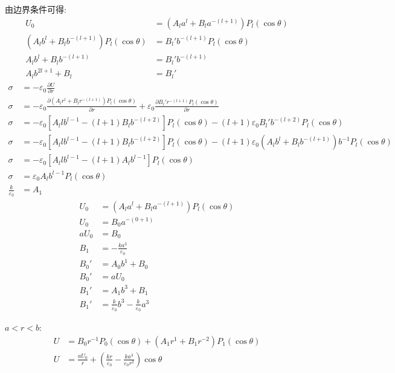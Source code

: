 由边界条件可得:
\begin{align*}
        U_0
&=
\left(
A_l a^l
+
B_l a^{-(l+1)}
\right)
P_{l}(\cos\theta)\\
    \left(
A_l b^l
+
B_l b^{-(l+1)}
\right)
P_{l}(\cos\theta)&=
B_l' b^{-(l+1)}
P_{l}(\cos\theta)\\
A_l b^l
+
B_l b^{-(l+1)}
&=
B_l' b^{-(l+1)}\\
A_l b^{2l+1}
+
B_l
&=
B_l'
\end{align*}
\begin{align*}
\sigma&=-\varepsilon_0\frac{\partial U}{\partial r}\\
\sigma&=-\varepsilon_0\frac{\partial \left(
A_l r^l
+
B_l r^{-(l+1)}
\right)
P_{l}(\cos\theta)}{\partial r}
+\varepsilon_0\frac{\partial B_l' r^{-(l+1)}
P_{l}(\cos\theta)}{\partial r}\\
\sigma&=-\varepsilon_0\left[
A_ll b^{l-1}
-(l+1)
B_l b^{-(l+2)}
\right]
P_{l}(\cos\theta)
-(l+1)\varepsilon_0B_l' b^{-(l+2)}
P_{l}(\cos\theta)\\
\sigma&=-\varepsilon_0\left[
A_ll b^{l-1}
-(l+1)
B_l b^{-(l+2)}
\right]
P_{l}(\cos\theta)
-(l+1)\varepsilon_0(A_l b^l
+
B_l b^{-(l+1)}) b^{-1}
P_{l}(\cos\theta)\\
\sigma&=-\varepsilon_0\left[
A_ll b^{l-1}-(l+1)A_lb^{l-1}
\right]
P_{l}(\cos\theta)\\
\sigma&=\varepsilon_0
A_l b^{l-1}
P_{l}(\cos\theta)\\
\frac{k}{\varepsilon_0}&=
A_1 
\end{align*}
\begin{align*}
    U_0
&=
\left(
A_l a^l
+
B_l a^{-(l+1)}
\right)
P_{l}(\cos\theta)\\
    U_0
&=
B_0 a^{-(0+1)}\\
    aU_0
&=
B_0\\
B_1&=-\frac{ka^3}{\varepsilon_0}\\
B_0'
&=
A_0 b^{1}
+
B_0\\
B_0'
&=
aU_0\\
B_1'
&=
A_1 b^{3}
+
B_1\\
B_1'
&=
\frac{k}{\varepsilon_0} b^{3}
-\frac{k}{\varepsilon_0} a^{3}
\end{align*}

$a<r<b$:
\begin{align*}
        U
&=
B_0 r^{-1}
P_{0}(\cos\theta)
+
\left(
A_1 r^1
+
B_1 r^{-2}
\right)
P_{1}(\cos\theta)\\
    U&=\frac{aU_0}{r}+\left(\frac{kr}{\varepsilon_0}-\frac{ka^3}{\varepsilon_0r^2}\right)\cos\theta
\end{align*}

